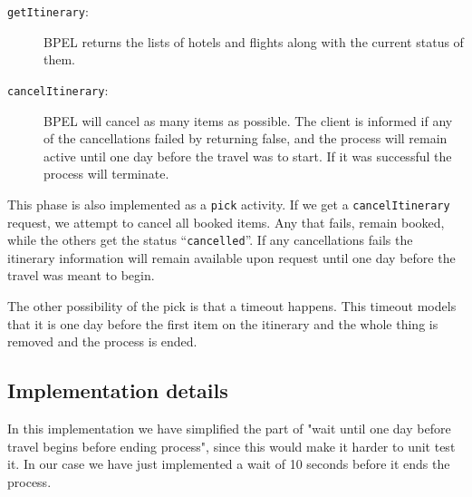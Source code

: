 \begin{description}
\item [\texttt{getItinerary}:] BPEL returns the lists of hotels and flights along with the current status of them.
\item [\texttt{cancelItinerary}:] BPEL will cancel as many items as possible. The client is informed if any of the cancellations failed by returning false, and the process will remain active until one day before the travel was to start. If it was successful the process will terminate.
\end{description}

This phase is also implemented as a \texttt{pick} activity. If we get a \texttt{cancelItinerary} request, we attempt to cancel all booked items. Any that fails, remain booked, while the others get the status ``\texttt{cancelled}''. If any cancellations fails the itinerary information will remain available upon request until one day before the travel was meant to begin. 

The other possibility of the pick is that a timeout happens. This timeout models that it is one day before the first item on the itinerary and the whole thing is removed and the process is ended.


\subsection{Implementation details}

In this implementation we have simplified the part of "wait until one day before travel begins before ending process", since this would make it harder to unit test it. In our case we have just implemented a wait of 10 seconds before it ends the process.